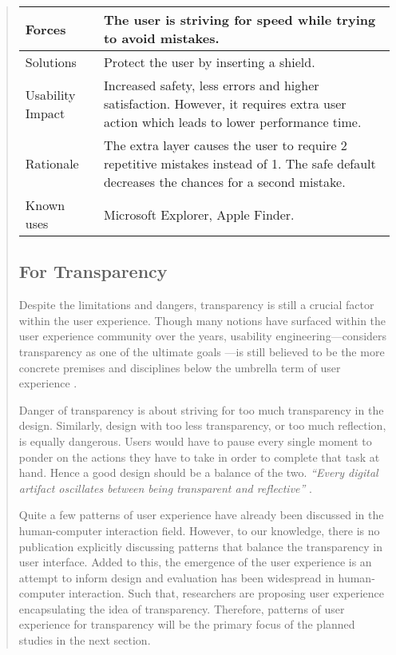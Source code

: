 \documentclass[a4paper,titlepage]{article}
\begin{document}
\begin{quote}
\begin{table}[!t]
\begin{center}
\begin{tabular}{| p{} || p{} |}
      Forces & The user is striving for speed while trying to avoid
      mistakes. \\ \hline

      Solutions & Protect the user by inserting a shield. \\ \hline

      Usability Impact & Increased safety, less errors and higher
      satisfaction. However, it requires extra user action which leads
      to lower performance time. \\ \hline

      Rationale & The extra layer causes the user to require 2
      repetitive mistakes instead of 1. The safe default decreases the
      chances for a second mistake. \\ \hline

      Known uses & Microsoft Explorer, Apple Finder. \\ \hline
    \end{tabular}
  \end{center}
\end{table}

\subsection{For Transparency}
Despite the limitations and dangers, transparency is still a crucial
factor within the user experience. Though many notions have surfaced
within the user experience community over the years, usability
engineering---considers transparency as one of the ultimate goals
\citep{transparency:rutkoski}---is still believed to be the more
concrete premises and disciplines below the umbrella term of user
experience \citep{future:memmel}.

Danger of transparency is about striving for too much transparency in
the design. Similarly, design with too less transparency, or too much
reflection, is equally dangerous. Users would have to pause every
single moment to ponder on the actions they have to take in order to
complete that task at hand. Hence a good design should be a balance of
the two. {\it ``Every digital artifact oscillates between being
  transparent and reflective''} \citep[p.~6]{windows:bolter}.

Quite a few patterns of user experience have already been discussed
\citep{participatory:dearden, speech:zajicek, unix:raymond,
  patterns:tidwell} in the human-computer interaction field. However,
to our knowledge, there is no publication explicitly discussing
patterns that balance the transparency in user interface. Added to
this, the emergence of the user experience is an attempt to inform
design and evaluation has been widespread in human-computer
interaction. Such that, researchers are proposing user experience
encapsulating the idea of transparency. Therefore, patterns of user
experience for transparency will be the primary focus of the planned
studies in the next section.



\end{quote}
\end{document}
